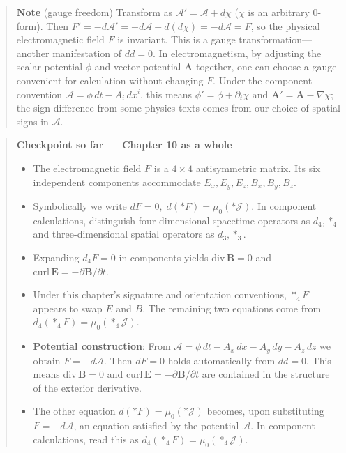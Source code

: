 \begin{quote}
\textbf{Note} (gauge freedom) Transform as
\(\mathcal{A}'=\mathcal{A}+d\chi\) (\(\chi\) is an arbitrary
\(0\)-form). Then
\(F'=-d\mathcal{A}'=-d\mathcal{A}-d(d\chi)=-d\mathcal{A}=F\), so the
physical electromagnetic field \(F\) is invariant. This is a gauge
transformation---another manifestation of \(dd=0\). In electromagnetism,
by adjusting the scalar potential \(\phi\) and vector potential
\(\mathbf{A}\) together, one can choose a gauge convenient for
calculation without changing \(F\). Under the component convention
\(\mathcal{A}=\phi\,dt-A_i\,dx^i\), this means
\(\phi'=\phi+\partial_t\chi\) and \(\mathbf{A}'=\mathbf{A}-\nabla\chi\);
the sign difference from some physics texts comes from our choice of
spatial signs in \(\mathcal{A}\).
\end{quote}

\begin{quote}
\textbf{Checkpoint so far — Chapter 10 as a whole}

\begin{itemize}
\item
  The electromagnetic field \(F\) is a \(4\times4\) antisymmetric
  matrix. Its six independent components accommodate
  \(E_x,E_y,E_z,B_x,B_y,B_z\).
\item
  Symbolically we write \(dF=0,\;d(\ast F)=\mu_0(\ast\mathcal{J})\). In
  component calculations, distinguish four-dimensional spacetime
  operators as \(d_4,\ast_4\) and three-dimensional spatial operators as
  \(d_3,\ast_3\).
\item
  Expanding \(d_4F=0\) in components yields
  \(\mathrm{div}\,\mathbf{B}=0\) and
  \(\mathrm{curl}\,\mathbf{E}=-\partial\mathbf{B}/\partial t\).
\item
  Under this chapter's signature and orientation conventions,
  \(\ast_4F\) appears to swap \(E\) and \(B\). The remaining two
  equations come from \(d_4(\ast_4F)=\mu_0(\ast_4\mathcal{J})\).
\item
  \textbf{Potential construction}: From
  \(\mathcal{A}=\phi\,dt-A_x\,dx-A_y\,dy-A_z\,dz\) we obtain
  \(F=-d\mathcal{A}\). Then \(dF=0\) holds automatically from \(dd=0\).
  This means \(\mathrm{div}\,\mathbf{B}=0\) and
  \(\mathrm{curl}\,\mathbf{E}=-\partial\mathbf{B}/\partial t\) are
  contained in the structure of the exterior derivative.
\item
  The other equation \(d(\ast F)=\mu_0(\ast\mathcal{J})\) becomes, upon
  substituting \(F=-d\mathcal{A}\), an equation satisfied by the
  potential \(\mathcal{A}\). In component calculations, read this as
  \(d_4(\ast_4F)=\mu_0(\ast_4\mathcal{J})\).
\end{itemize}
\end{quote}

